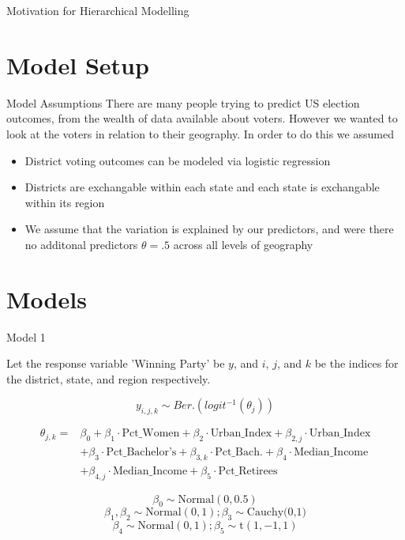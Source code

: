 \documentclass{beamer}
\begin{document}
\begin{frame}{Motivation for Hierarchical Modelling}
\section{Model Setup}
\begin{frame}{Model Assumptions}
  There are many people trying to predict US election outcomes, from the wealth of data available about voters. However we wanted to look at the voters in relation to their geography. In order to do this we assumed 
  \begin{itemize}
    \item District voting outcomes can be modeled via logistic regression 
    \item Districts are exchangable within each state and each state is exchangable within its region
    \item We assume that the variation is explained by our predictors, and were there no additonal predictors $\theta = .5$ across all levels of geography 
  \end{itemize}
  \end{frame}





\section{Models}

\begin{frame}{Model 1}


    Let the response variable 'Winning Party' be \(y\), and \(i\), \(j\), and \(k\) be the indices for the district, state, and region respectively. 

    \[y_{i,j,k} \sim Ber.(logit^{-1}(\theta_{j}))\]
    
\[
\begin{aligned}
   \theta_{j,k} = &\beta_0 + \beta_1 \cdot \text{Pct\_Women} + \beta_2 \cdot \text{Urban\_Index} + \beta_{2,j} \cdot \text{Urban\_Index} \\
    &+ \beta_3 \cdot \text{Pct\_Bachelor's} + \beta_{3,k} \cdot \text{Pct\_Bach.} + \beta_{4} \cdot \text{Median\_Income} \\ 
    &+ \beta_{4,j} \cdot \text{Median\_Income} + \beta_{5} \cdot \text{Pct\_Retirees}
\end{aligned}
\]

    \[\beta_0 \sim \text{Normal}(0, 0.5)\]
    \[\beta_1, \beta_2 \sim \text{Normal}(0, 1); \beta_3 \sim \text{Cauchy(0,1)}\] 
    \[\beta_4 \sim \text{Normal}(0,1); \beta_5 \sim \text{t}(1,-1,1)\]
    

\end{frame}
\end{frame}
\end{document}
